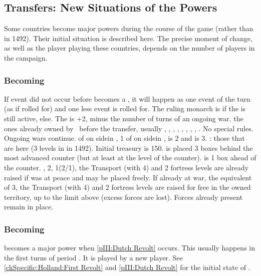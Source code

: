 \subsection{Transfers: New Situations of the Powers}
\aparag Some countries become major powers during the course of the game
(rather than in 1492). Their initial situation is described here.
\bparag The precise moment of change, as well as the player playing these
countries, depends on the number of players in the campaign.

\subsubsection{Becoming \paysmajeurSuede}
\aparag If event  did not occur before \SUE becomes a
\MAJ, it will happen as one event of the turn (as if rolled for) and one less
event is rolled for.
 The ruling monarch is  if the
 is still active,  else. The \STAB
is +2, minus the number of turns of an ongoing war.
 the ones already owned by \MIN\ \payssuede before the
transfer, usually \provinceSmaland, \provinceJamtland, \provinceGastrikland,
\provinceBergslagen, \provinceSvealand, \provinceFinland, \provinceTavastland,
\provinceNyland, \provinceKarelen.
 No special rules. Ongoing wars continue.
\MNU of  on side\faceplus in \provinceSvealand, 1 \MNU of
 on side\faceplus in \provinceJamtland, \FTI is 2 and \DTI is
3. \TradeFLEET: those that are here (3 levels in \seazoneBaltique in 1492).
\bparag Initial treasury is 150\ducats.
\aparag[Military]
\bparag {} is placed 3 boxes behind the most advanced
counter (but at least at the level of the  counter).  is 1 box ahead of the  counter.
\ARMY\faceplus, 2\LD, 1\FLEET\facemoins (2\NWD/1\NTD), the Transport
\FLEET\faceplus (with 4\NTD) and 2 fortress levels are already raised if
\payssuede was at peace and may be placed freely. If already at war, the
equivalent of 3\LD, the Transport \FLEET\faceplus (with 4\NTD) and 2 fortress
levels are raised for free in the owned territory, up to the limit above
(excess forces are lost). Forces already present remain in place.


\subsubsection{Becoming \paysmajeurHollande}
\aparag \HOL becomes a major power when \ref{pIII:Dutch Revolt} occurs. This
usually happens in the first turns of period .
\bparag It is played by a new player.
\aparag See \ref{chSpecific:Holland:First Revolt} and \ref{pIII:Dutch Revolt}
for the initial state of \paysmajeurHollande.


